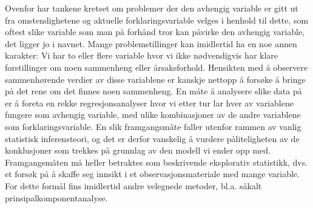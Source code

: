 Ovenfor har tankene kretset om problemer der den avhengig variable er gitt
ut fra omstendighetene og aktuelle forklaringsvariable velges i henhold til
dette, som oftest slike variable som man på forhånd tror kan
påvirke den avhengig variable, det ligger jo i navnet.  Mange
problemstillinger kan imidlertid ha en noe annen karakter:  Vi har to eller
flere variable hvor vi ikke nødvendigvis har klare forstillinger om noen
sammenheng eller årsaksforhold.  Hensikten med å observere 
sammenhørende verdier av disse variablene er kanskje nettopp å
forsøke å bringe på det rene om det finnes noen sammenheng. 
En måte å analysere slike data på er å foreta en rekke
regresjonsanalyser hvor vi etter tur lar hver av variablene fungere som
avhengig variable, med ulike kombinasjoner av de andre variablene som
forklaringsvariable.  En slik framgangsmåte faller utenfor rammen av
vanlig statistisk inferensteori, og det er derfor vanskelig å vurdere
påliteligheten av de konklusjoner som trekkes på grunnlag av den
modell vi ender opp med.  Framgangsmåten må heller betraktes som
beskrivende eksplorativ statistikk, dvs. et forsøk på å skaffe seg
innsikt i et observasjonsmateriale med mange variable.  For dette formål
 fins imidlertid andre velegnede metoder, bl.a. såkalt
 prinsipalkomponentanalyse.



